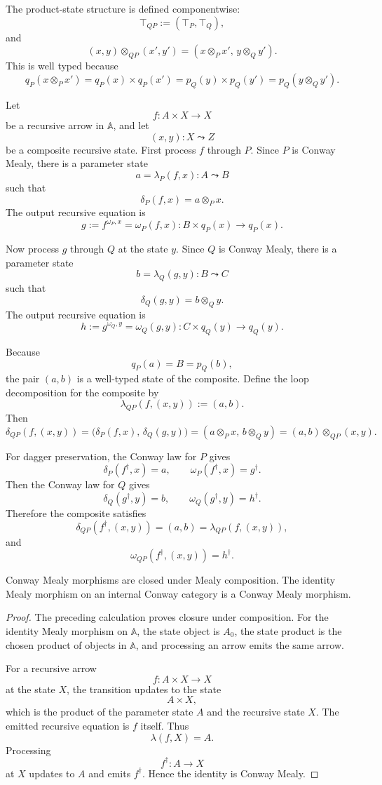 The product-state structure is defined componentwise:
\[
\top_{QP}:=(\top_P,\top_Q),
\]
and
\[
(x,y)\otimes_{QP}(x',y')
=
(x\otimes_P x',\,y\otimes_Q y').
\]
This is well typed because
\[
q_P(x\otimes_P x')
=
q_P(x)\times q_P(x')
=
p_Q(y)\times p_Q(y')
=
p_Q(y\otimes_Q y').
\]

Let
\[
f:A\times X\to X
\]
be a recursive arrow in \(\mathbb A\), and let
\[
(x,y):X\leadsto Z
\]
be a composite recursive state.  First process \(f\) through \(P\).  Since
\(P\) is Conway Mealy, there is a parameter state
\[
a=\lambda_P(f,x):A\leadsto B
\]
such that
\[
\delta_P(f,x)=a\otimes_P x.
\]
The output recursive equation is
\[
g:=f^{\omega_P,x}
=
\omega_P(f,x):
B\times q_P(x)\to q_P(x).
\]

Now process \(g\) through \(Q\) at the state \(y\).  Since \(Q\) is Conway
Mealy, there is a parameter state
\[
b=\lambda_Q(g,y):B\leadsto C
\]
such that
\[
\delta_Q(g,y)=b\otimes_Q y.
\]
The output recursive equation is
\[
h:=g^{\omega_Q,y}
=
\omega_Q(g,y):
C\times q_Q(y)\to q_Q(y).
\]

Because
\[
q_P(a)=B=p_Q(b),
\]
the pair \((a,b)\) is a well-typed state of the composite.  Define the loop
decomposition for the composite by
\[
\lambda_{QP}(f,(x,y))
:=
(a,b).
\]
Then
\[
\delta_{QP}(f,(x,y))
=
\bigl(\delta_P(f,x),\,\delta_Q(g,y)\bigr)
=
(a\otimes_P x,\,b\otimes_Q y)
=
(a,b)\otimes_{QP}(x,y).
\]

For dagger preservation, the Conway law for \(P\) gives
\[
\delta_P(f^\dagger,x)=a,
\qquad
\omega_P(f^\dagger,x)=g^\dagger.
\]
Then the Conway law for \(Q\) gives
\[
\delta_Q(g^\dagger,y)=b,
\qquad
\omega_Q(g^\dagger,y)=h^\dagger.
\]
Therefore the composite satisfies
\[
\delta_{QP}(f^\dagger,(x,y))
=
(a,b)
=
\lambda_{QP}(f,(x,y)),
\]
and
\[
\omega_{QP}(f^\dagger,(x,y))
=
h^\dagger.
\]

\begin{proposition}
\label{prop:conway-mealy-closed-composition}
Conway Mealy morphisms are closed under Mealy composition.  The identity
Mealy morphism on an internal Conway category is a Conway Mealy morphism.
\end{proposition}

\begin{proof}
The preceding calculation proves closure under composition.  For the identity
Mealy morphism on \(\mathbb A\), the state object is \(A_0\), the state product
is the chosen product of objects in \(\mathbb A\), and processing an arrow
emits the same arrow.

For a recursive arrow
\[
f:A\times X\to X
\]
at the state \(X\), the transition updates to the state
\[
A\times X,
\]
which is the product of the parameter state \(A\) and the recursive state
\(X\).  The emitted recursive equation is \(f\) itself.  Thus
\[
\lambda(f,X)=A.
\]
Processing
\[
f^\dagger:A\to X
\]
at \(X\) updates to \(A\) and emits \(f^\dagger\).  Hence the identity is
Conway Mealy.
\end{proof}

